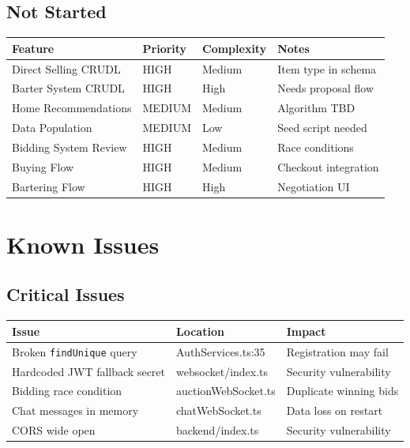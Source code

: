 \documentclass[12pt,a4paper]{article}
\begin{document}
\subsection{Not Started}

\begin{infobox}
\begin{tabularx}{\textwidth}{|l|l|l|X|}
\hline
\textbf{Feature} & \textbf{Priority} & \textbf{Complexity} & \textbf{Notes} \\
\hline
Direct Selling CRUDL & HIGH & Medium & Item type in schema \\
\hline
Barter System CRUDL & HIGH & High & Needs proposal flow \\
\hline
Home Recommendations & MEDIUM & Medium & Algorithm TBD \\
\hline
Data Population & MEDIUM & Low & Seed script needed \\
\hline
Bidding System Review & HIGH & Medium & Race conditions \\
\hline
Buying Flow & HIGH & Medium & Checkout integration \\
\hline
Bartering Flow & HIGH & High & Negotiation UI \\
\hline
\end{tabularx}
\end{infobox}

\section{Known Issues}

\subsection{Critical Issues}

\begin{dangerbox}
\begin{tabularx}{\textwidth}{|X|l|X|}
\hline
\textbf{Issue} & \textbf{Location} & \textbf{Impact} \\
\hline
Broken \texttt{findUnique} query & AuthServices.ts:35 & Registration may fail \\
\hline
Hardcoded JWT fallback secret & websocket/index.ts & Security vulnerability \\
\hline
Bidding race condition & auctionWebSocket.ts & Duplicate winning bids \\
\hline
Chat messages in memory & chatWebSocket.ts & Data loss on restart \\
\hline
CORS wide open & backend/index.ts & Security vulnerability \\
\hline
\end{tabularx}
\end{dangerbox}
\end{document}

